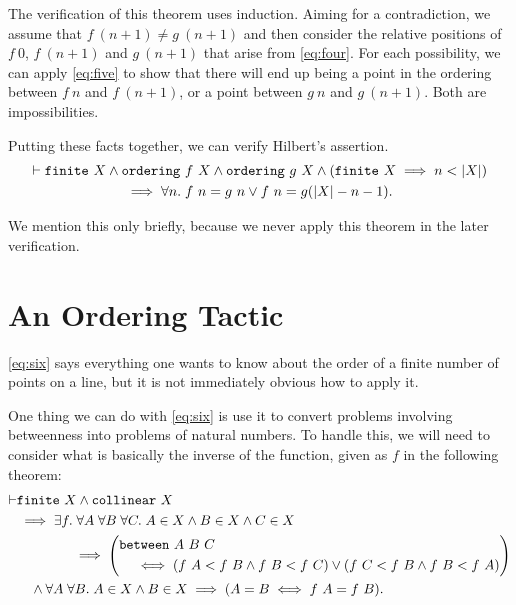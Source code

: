 The verification of this theorem uses induction. Aiming for a contradiction, we assume that $f\ (n+1) \neq g\ (n+1)$ and then consider the relative positions of $f\ 0$, \mbox{$f\ (n+1)$} and $g\ (n+1)$ that arise from \ref{eq:four}. For each possibility, we can apply \ref{eq:five} to show that there will end up being a point in the ordering between $f\ n$ and $f\ (n+1)$, or a point between $g\ n$ and $g\ (n+1)$. Both are impossibilities.

Putting these facts together, we can verify Hilbert's assertion.
\begin{multline*}
  \vdash\texttt{finite}\ X \wedge \texttt{ordering}\ f\ X \wedge \texttt{ordering}\ g\ X \wedge (\texttt{finite}\ X \implies n < |X|)\\
  \implies \forall n.\; f\ n = g\ n \vee f\ n = g (|X| - n - 1).
\end{multline*}

We mention this only briefly, because we never apply this theorem in the later verification.

\section{An Ordering Tactic}
\ref{eq:six} says everything one wants to know about the order of a finite number of points on a line, but it is not immediately obvious how to apply it.

One thing we can do with \ref{eq:six} is use it to convert problems involving betweenness into problems of natural numbers. To handle this, we will need to consider what is basically the inverse of the  function, given as $f$ in the following theorem:
\begin{equation*}
\begin{split}
  \vdash&\texttt{finite}\ X \wedge \texttt{collinear}\ X\\
  &\implies \exists f.\; \forall A\;\forall B\;\forall C.\;A \in X \wedge B \in X \wedge C \in X \\
  &\qquad\qquad\implies\left(\begin{aligned}&\texttt{between}\ A\ B\ C \\ &\quad
  \iff (f\ A < f\ B \wedge f\ B < f\ C) \vee (f\ C < f\ B \wedge f\ B < f\ A)\end{aligned}\right)\\
  &\quad\wedge \forall A\;\forall B.\; A \in X \wedge B \in X \implies (A = B \iff f\ A = f\ B).
\end{split}
\end{equation*}

